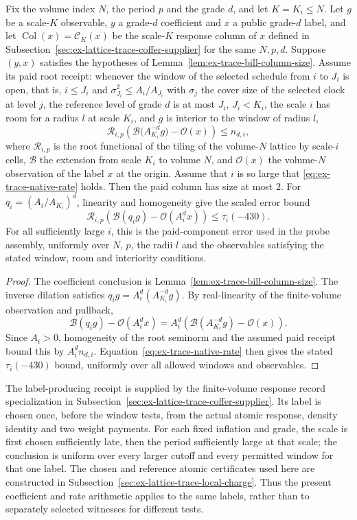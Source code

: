 \begin{proposition}
\label{prop:ex-trace-bill-root-price}
Fix the volume index $N$, the period $p$ and the grade $d$, and let
$K=K_i\le N$. Let $g$ be a scale-$K$ observable, $y$ a grade-$d$
coefficient and $x$ a public grade-$d$ label, and let
$\operatorname{Col}(x)=\mathcal C_K(x)$ be the scale-$K$ response column of
$x$ defined in Subsection~\ref{sec:ex-lattice-trace-coffer-supplier} for the
same $N,p,d$. Suppose $(y,x)$ satisfies the hypotheses of
Lemma~\ref{lem:ex-trace-bill-column-size}. Assume its paid root receipt:
whenever the window of the selected schedule from $i$ to $J_i$ is open,
that is, $i\le J_i$ and $\sigma_{J_i}^2\le A_i/A_{J_i}$ with $\sigma_j$ the
cover size of the selected clock at level $j$,
the reference level of grade $d$ is at most $J_i$, $J_i<K_i$, the scale
$i$ has room for a radius $l$ at scale $K_i$, and $g$ is interior to the
window of radius $l$,
\[
 \mathcal R_{i,p}\!\left(
   \mathcal B\bigl(A_{K_i}^{-d}g\bigr)-\mathcal O(x)\right)
       \leq n_{d,i},
\]
where $\mathcal R_{i,p}$ is the root functional of the tiling of the
volume-$N$ lattice by scale-$i$ cells, $\mathcal B$ the extension from
scale $K_i$ to volume $N$, and $\mathcal O(x)$ the volume-$N$ observation
of the label $x$ at the origin. Assume that $i$ is so large that
\eqref{eq:ex-trace-native-rate} holds.
Then the paid column has size at most $2$. For
$q_i=(A_i/A_{K_i})^d$, linearity and homogeneity give the scaled error
bound
\[
 \mathcal R_{i,p}\!\left(
   \mathcal B(q_i g)-\mathcal O(A_i^d x)\right)
      \leq\tau_i(-430).
\]
For all sufficiently large $i$, this is the paid-component error used in the
probe assembly, uniformly over $N$, $p$, the radii $l$ and the observables
satisfying the stated window, room and interiority conditions.
\end{proposition}
\begin{proof}
The coefficient conclusion is Lemma~\ref{lem:ex-trace-bill-column-size}.
The inverse dilation satisfies $q_i g=A_i^d(A_{K_i}^{-d}g)$. By
real-linearity of the finite-volume observation and pullback,
\[
 \mathcal B(q_i g)-\mathcal O(A_i^d x)
   =A_i^d\left(\mathcal B(A_{K_i}^{-d}g)-\mathcal O(x)\right).
\]
Since $A_i>0$, homogeneity of the root seminorm and the assumed paid receipt
bound this by $A_i^d n_{d,i}$. Equation~\eqref{eq:ex-trace-native-rate}
then gives the stated $\tau_i(-430)$ bound, uniformly over all allowed
windows and observables.
\end{proof}

The label-producing receipt is supplied by the finite-volume response record specialization in
Subsection~\ref{sec:ex-lattice-trace-coffer-supplier}. Its label is chosen
once, before the window tests, from the actual atomic response, density
identity and two weight payments. For each fixed inflation and grade,
the scale is first chosen sufficiently late, then the period sufficiently
large at that scale; the conclusion is uniform over every larger cutoff
and every permitted window for that one label. The chosen and reference
atomic certificates used here are constructed in
Subsection~\ref{sec:ex-lattice-trace-local-charge}. Thus the present
coefficient and rate arithmetic applies to the same labels, rather than
to separately selected witnesses for different tests.
